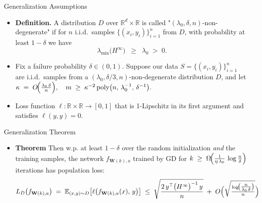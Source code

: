 \documentclass[serif, aspectratio=169]{beamer}
\begin{document}
\begin{frame}{Generalization Assumptions}
	\begin{itemize}
		
		\item \textbf{Definition.}
		A distribution $D$ over $\mathbb{R}^d \times \mathbb{R}$ is called 
		"$(\lambda_0,\delta,n)${-non-degenerate}"
		if for $n$ i.i.d.\ samples $\{(x_i,y_i)\}_{i=1}^n$ from $D$, 
		with probability at least $1 - \delta$ we have
		\[
		\lambda_{\min}\bigl(H^\infty\bigr) \;\;\ge\;\; \lambda_0 \;>\; 0.
		\]
		
		
		\item Fix a failure probability $\delta \in (0,1)$. 
		Suppose our data $S = \{(x_i,y_i)\}_{i=1}^n$ are i.i.d.\ samples 
		from a $(\lambda_0,\delta/3,n)$-non-degenerate distribution $D$, 
		and let \(
		\kappa \;=\; O\!\Bigl(\tfrac{\lambda_0\,\delta}{n}\Bigr),
		\quad
		m \;\ge\; \kappa^{-2}\,\mathrm{poly}\bigl(n,\,\lambda_0^{-1},\,\delta^{-1}\bigr).
		\)
		\item Loss function 
		$\ell:\mathbb{R}\times\mathbb{R}\to[0,1]$ 
		that is 1-Lipschitz in its first argument and satisfies $\ell(y,y)=0$. 
		
	\end{itemize}
\end{frame}


\begin{frame}{Generalization Theorem}
	\begin{itemize}
		\item \textbf{Theorem} Then w.p. at least $1 - \delta$ 
		over the random initialization \emph{and} the training samples,
		the network $f_{\mathbf{W}(k),a}$ 
		trained by GD for 
		\(
		k \;\ge\; \Omega\!\Bigl(\tfrac{1}{\eta\,\lambda_0}\,\log\tfrac{n}{\delta}\Bigr)
		\) iterations
		has population loss:
		\[
		L_D\bigl(f_{\mathbf{W}(k),a}\bigr)
		\;=\;
		\mathbb{E}_{(x,y)\sim D}\bigl[\ell\bigl(f_{\mathbf{W}(k),a}(x),\,y\bigr)\bigr]
		\;\le\;
		\sqrt{\frac{2\,y^\top \bigl(H^\infty\bigr)^{-1}\,y}{n}}
		\;+\;
		O\Bigl(\sqrt{\tfrac{\log\!\bigl(\tfrac{n}{\lambda_0\,\delta}\bigr)}{n}}\Bigr)
		\]
	\end{itemize}
\end{frame}
\end{document}
